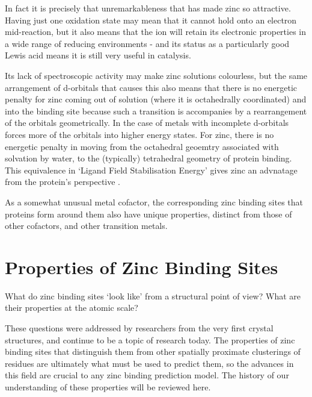 In fact it is precisely that unremarkableness that has made zinc so attractive. Having just one oxidation state may mean that it cannot hold onto an electron mid-reaction, but it also means that the ion will retain its electronic properties in a wide range of reducing environments - and its status as a particularly good Lewis acid means it is still very useful in catalysis. 

Its lack of spectroscopic activity may make zinc solutions colourless, but the same arrangement of d-orbitals that causes this also means that there is no energetic penalty for zinc coming out of solution (where it is octahedrally coordinated) and into the binding site because such a transition is accompanies by a rearrangement of the orbitals geometrically. In the case of metals with incomplete d-orbitals forces more of the orbitals into higher energy states. For zinc, there is no energetic penalty in moving from the octahedral geoemtry associated with solvation by water, to the (typically) tetrahedral geometry of protein binding. This equivalence in `Ligand Field Stabilisation Energy' gives zinc an advnatage from the protein's perspective \cite{lachenmann2004zinc}.

As a somewhat unusual metal cofactor, the corresponding zinc binding sites that proteins form around them also have unique properties, distinct from those of other cofactors, and other transition metals.

\section{Properties of Zinc Binding Sites}

What do zinc binding sites `look like' from a structural point of view? What are their properties at the atomic scale?

These questions were addressed by researchers from the very first crystal structures, and continue to be a topic of research today. The properties of zinc binding sites that distinguish them from other spatially proximate clusterings of residues are ultimately what must be used to predict them, so the advances in this field are crucial to any zinc binding prediction model. The history of our understanding of these properties will be reviewed here.

